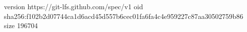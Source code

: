 version https://git-lfs.github.com/spec/v1
oid sha256:f102b2d07744ca1d6acd45d557b6cec01fa6fa4c4e959227c87aa30502759b86
size 196704
